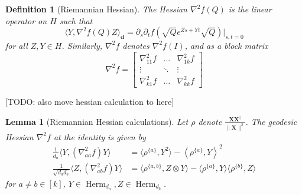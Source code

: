 \documentclass{article}
\newtheorem{lemma}[theorem]{Lemma}
\newtheorem{definition}{Definition}
\renewcommand{\vec}{\bm}
\newcommand\Herm{\operatorname{Herm}}
\newcommand{\TODO}[1]{{\color{blue}[TODO: #1]}}
\begin{document}
\begin{definition}[Riemannian Hessian]
The Hessian $\nabla^2 f(Q)$ is the linear operator on $H$ such that
$$\langle Y,  \nabla^2 f(Q) Z \rangle_{\vec d} = \partial_s \partial_t f(\sqrt{Q}e^{Zs + Yt}\sqrt{Q})|_{s,t = 0}$$
for all $Z, Y \in H$. Similarly, $\nabla^2 f$ denotes $\nabla^2 f(I)$, and as a block matrix
$$\nabla^2 f = \begin{bmatrix}
\nabla_{11}^2 f &  \dots &  \nabla^2_{1k} f \\
\vdots &  \ddots &  \vdots\\
 \nabla_{k1}^2 f &  \dots &  \nabla_{kk}^2 f
 \end{bmatrix}$$
\end{definition}
\TODO{also move hessian calculation to here}
\begin{lemma}[Riemannian Hessian calculations]
Let $\rho$ denote $\frac{\vec X \vec X^\dagger}{\|\vec X\|^2}$. 
The geodesic Hessian $\nabla^2 f$ at the identity is given by
\begin{align}\frac{1}{d_a}\langle Y, (\nabla^{2}_{aa} f) Y \rangle &= \langle \rho^{\{a\}}, Y^{2} \rangle - \left\langle \rho^{\{a\}}, Y \right\rangle^{2} \\
\frac{1}{\sqrt{d_a d_b}}\langle Z, (\nabla^{2}_{ab} f) Y \rangle &= \langle \rho^{\{a,b\}}, Z \otimes Y \rangle  - \langle \rho^{\{a\}}, Y \rangle \langle \rho^{\{b\}}, Z \rangle
\end{align}
for $a \neq b \in [k]$, $Y \in \Herm_{d_a}, Z \in \Herm_{d_b}$.
\end{lemma}
\end{document}
